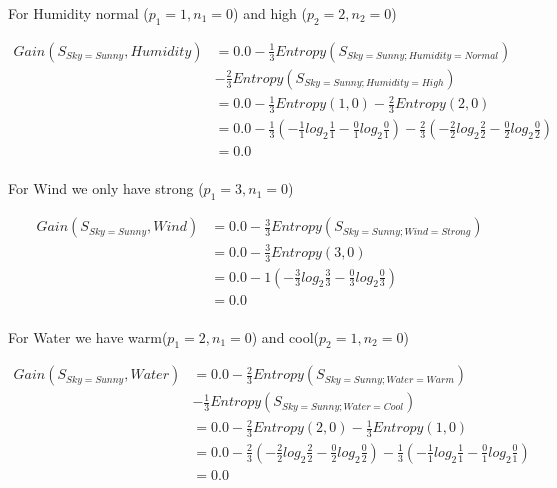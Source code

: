 \documentclass[10pt,a4paper]{article}
\begin{document}
{{{{{{{{{{For Humidity normal ($p_1=1,n_1=0$) and high ($p_2=2,n_2=0$)

\begin{equation}
\begin{split}
Gain(S_{Sky=Sunny},Humidity) &= 0.0 - \frac{1}{3} Entropy(S_{Sky=Sunny;Humidity=Normal} ) \\
&-
    \frac{2}{3}Entropy(S_{Sky=Sunny;Humidity=High})\\
          &= 0.0 - \frac{1}{3} Entropy(1,0) - \frac{2}{3}Entropy(2,0)\\
          &= 0.0 - \frac{1}{3}( -\frac{1}{1} log_2\frac{1}{1} -\frac{0}{1} log_2\frac{0}{1} ) -\frac{2}{3}( -\frac{2}{2}log_2\frac{2}{2} - \frac{0}{2}log_2\frac{0}{2} )  \\
          &= 0.0 \\
\end{split}
\end{equation}

For Wind we only have strong ($p_1=3,n_1=0$)

\begin{equation}
\begin{split}
Gain(S_{Sky=Sunny},Wind) &= 0.0 - \frac{3}{3} Entropy(S_{Sky=Sunny;Wind=Strong} )\\
          &= 0.0 - \frac{3}{3} Entropy(3,0) \\
          &= 0.0 - 1( -\frac{3}{3} log_2\frac{3}{3} -\frac{0}{3} log_2\frac{0}{3} )  \\
          &= 0.0 \\
\end{split}
\end{equation}

For Water we have warm($p_1=2,n_1=0$) and cool($p_2=1,n_2=0$)

\begin{equation}
\begin{split}
Gain(S_{Sky=Sunny},Water) &= 0.0 - \frac{2}{3} Entropy(S_{Sky=Sunny;Water=Warm} ) \\
&-
    \frac{1}{3}Entropy(S_{Sky=Sunny;Water=Cool})\\
          &= 0.0 - \frac{2}{3} Entropy(2,0) - \frac{1}{3}Entropy(1,0)\\
          &= 0.0 - \frac{2}{3}( -\frac{2}{2} log_2\frac{2}{2} -\frac{0}{2} log_2\frac{0}{2} ) -\frac{1}{3}( -\frac{1}{1}log_2\frac{1}{1} - \frac{0}{1}log_2\frac{0}{1} )  \\
          &= 0.0 \\
\end{split}
\end{equation}

}}}}}}}}}}
\end{document}
